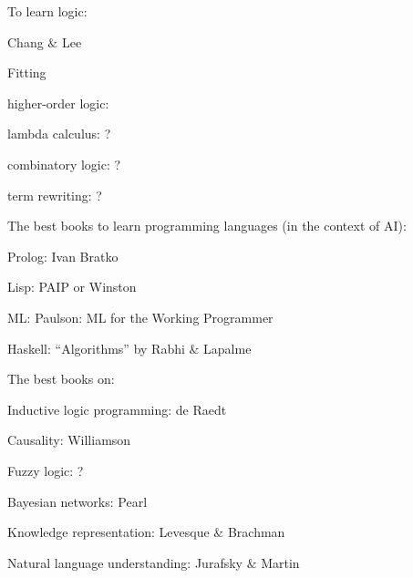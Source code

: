 To learn logic:
\begin{compactenum}[\textbullet ]
\item Chang $\&$ Lee
\item Fitting
\item higher-order logic:
\item lambda calculus: ?
\item combinatory logic: ?
\item term rewriting: ?
\end{compactenum}

The best books to learn programming languages (in the context of AI):
\begin{compactenum}[\textbullet ]
\item Prolog: Ivan Bratko
\item Lisp: PAIP or Winston
\item ML: Paulson: ML for the Working Programmer
\item Haskell: ``Algorithms'' by Rabhi $\&$ Lapalme
\end{compactenum}

The best books on:
\begin{compactenum}[\textbullet ]
\item Inductive logic programming: de Raedt
\item Causality: Williamson
\item Fuzzy logic: ?
\item Bayesian networks: Pearl
\item Knowledge representation: Levesque $\&$ Brachman
\item Natural language understanding: Jurafsky $\&$ Martin
\end{compactenum}
